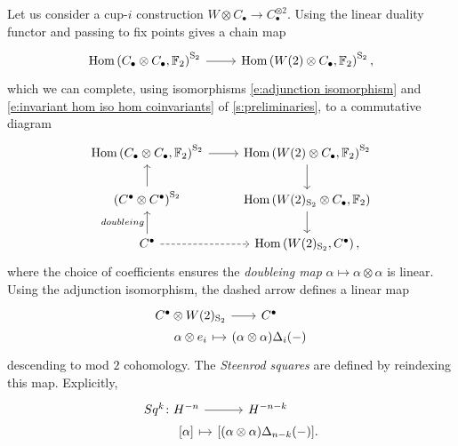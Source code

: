 Let us consider a cup-$i$ construction $W \otimes C_\bullet \to C_\bullet^{\otimes 2}$.
Using the linear duality functor and passing to fix points gives a chain map
\begin{equation*}
\begin{tikzcd}
\Hom\left(C_\bullet \otimes C_\bullet, \Ftwo \right)^{\mathrm S_2} \arrow[r] &
\Hom\left(W(2) \otimes C_\bullet, \Ftwo \right)^{\mathrm S_2},
\end{tikzcd}
\end{equation*}
which we can complete, using isomorphisms \eqref{e:adjunction isomorphism} and \eqref{e:invariant hom iso hom coinvariants} of \cref{s:preliminaries}, to a commutative diagram
\begin{equation*}
\begin{tikzcd}
\Hom\left(C_\bullet \otimes C_\bullet, \Ftwo \right)^{\mathrm S_2} \arrow[r] &
\Hom\left(W(2) \otimes C_\bullet, \Ftwo \right)^{\mathrm S_2} \arrow[d] \\
\left(C^\bullet \otimes C^\bullet\right)^{\mathrm S_2} \arrow[u]&
\Hom\left(W(2)_{\mathrm S_2} \otimes C_\bullet, \Ftwo \right) \arrow[d] \\
C^\bullet \arrow[u, "doubleing"] \arrow[r, dashed]&
\Hom\left(W(2)_{\mathrm S_2}, C^\bullet\right),
\end{tikzcd}
\end{equation*}
where the choice of coefficients ensures the \textit{doubleing map} $\alpha \mapsto \alpha \otimes \alpha$ is linear.
Using the adjunction isomorphism, the dashed arrow defines a linear map
\begin{equation} \label{e:Steenrod squares parameterized}
\begin{tikzcd}[row sep=0pt, column sep = tiny]
C^\bullet \otimes W(2)_{\mathrm S_2} \arrow[r] &[-10pt] C^\bullet \\
\alpha \otimes e_i \arrow[r, |->] & (\alpha \otimes \alpha)\Delta_i(-)
\end{tikzcd}
\end{equation}
descending to mod $2$ cohomology.
The \textit{Steenrod squares} are defined by reindexing this map.
Explicitly,
\begin{equation*}
\begin{tikzcd}[row sep=0pt, column sep=tiny]
Sq^k \colon H^{-n} \arrow[r] & H^{-n-k} \\
\phantom{Sq^k \colon}{[\alpha]} \arrow[r, |->] & {\left[(\alpha \otimes \alpha)\Delta_{n-k}(-) \right]}.
\end{tikzcd}
\end{equation*}

